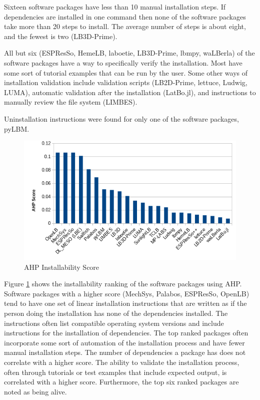 \documentclass[12pt, notitlepage]{article}
\begin{document}
Sixteen software packages have less than 10 manual installation steps. If dependencies are installed in one command then none of the software packages take more than 20 steps to install. The average number of steps is about eight, and the fewest is two (LB3D-Prime). 

All but six (ESPResSo, HemeLB, laboetie, LB3D-Prime, lbmpy, waLBerla) of the software packages have a way to specifically verify the installation. Most have some sort of tutorial examples that can be run by the user. Some other ways of installation validation include validation scripts (LB2D-Prime, lettuce, Ludwig, LUMA), automatic validation after the installation (LatBo.jl), and instructions to manually review the file system (LIMBES). 

Uninstallation instructions were found for only one of the software packages, pyLBM.

\begin{figure}[h!]
	\begin{center}
		\includegraphics[width=1.0\textwidth]{installability_chart}
		\caption{AHP Installability Score}
		\label{Fig_Installability}
	\end{center}
\end{figure}

Figure \ref{Fig_Installability} shows the installability ranking of the software packages using AHP. Software packages with a higher score (MechSys, Palabos, ESPResSo, OpenLB) tend to have one set of linear installation instructions that are written as if the person doing the installation has none of the dependencies installed. The instructions often list compatible operating system versions and include instructions for the installation of dependencies. The top ranked packages often incorporate some sort of automation of the installation process and have fewer manual installation steps. The number of dependencies a package has does not correlate with a higher score. The ability to validate the installation process, often through tutorials or test examples that include expected output, is correlated with a higher score. Furthermore, the top six ranked packages are noted as being alive. 
\end{document}
